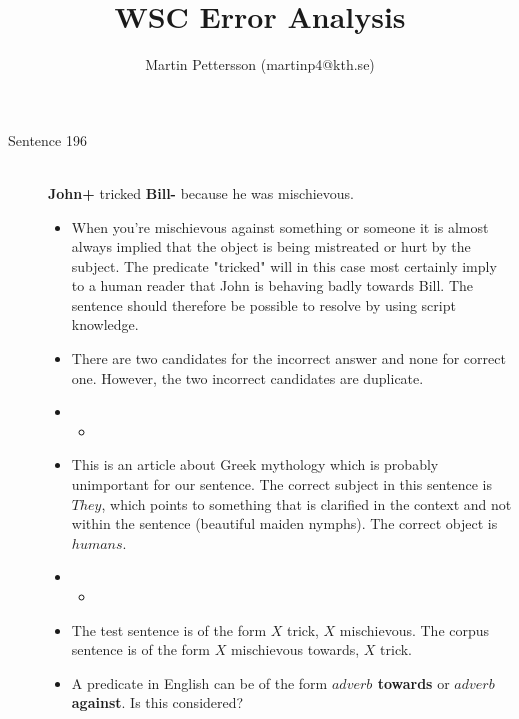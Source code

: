 \documentclass{article}
\newcommand{\insertcode}[2]{\begin{itemize}\item[]\end{itemize}} %
\begin{document}
\title{WSC Error Analysis}
\author{Martin Pettersson (martinp4@kth.se)}
\maketitle



\begin{description}


  \item[Sentence 196] \hfill \\
  {\bf John+} tricked {\bf Bill-} because he was mischievous.
  \begin{itemize}
  	\item When you're mischievous against something or someone it is almost always implied that the object is being mistreated or hurt by the subject. The predicate "tricked" will in this case most certainly imply to a human reader that John is behaving badly towards Bill. The sentence should therefore be possible to resolve by using script knowledge.
  	\item There are two candidates for the incorrect answer and none for correct one. However, the two incorrect candidates are duplicate.
  	\item \insertcode{"Scripts/196/196-1.sentence"}{Context for $R_1$ and $R_2$ (duplicates).}
  	\item This is an article about Greek mythology which is probably unimportant for our sentence. The correct subject in this sentence is $They$, which points to something that is clarified in the context and not within the sentence (beautiful maiden nymphs). The correct object is $humans$. 
  	\item \insertcode{"Scripts/196/196-2.sentence"}{Target sentence in $R_1$ and $R_2$.}
  	\item The test sentence is of the form $X$ trick, $X$ mischievous. The corpus sentence is of the form $X$ mischievous towards, $X$ trick.
  	\item A predicate in English can be of the form {\bf $adverb$ towards} or {\bf $adverb$ against}. Is this considered? 
  \end{itemize}


\end{description}
\end{document}
